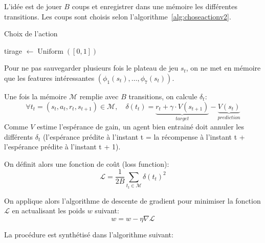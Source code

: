 \documentclass{report}
\DeclareMathOperator{\argmax}{argmax}
\DeclareMathOperator{\uniform}{Uniform}
\begin{document}
L'idée est de jouer \( B \) coups et enregistrer dans une mémoire les différentes
transitions. Les coups sont choisis selon l'algorithme~\ref{alg:choseactionv2}.

\begin{algorithm}[h]
  \caption{Choix de l'action}\label{alg:choseactionv2}
  \begin{algorithmic}
    [1]
    \State{} tirage \(\gets \uniform([0, 1])\)
    \State{}\Return{\(\argmax_{{a_t}\in\mathcal{A}} [r_t + \gamma V(s_{t+1})] \)}
    \\ 
    \Else{}
    \State{}\Return{\(\uniform(\mathcal{A})\)}
    \EndIf{}
    \EndProcedure{}
  \end{algorithmic}
\end{algorithm}

Pour ne pas sauvegarder plusieurs fois le plateau de jeu \(s_t\), on ne met en
mémoire que les features intéressantes \( (\phi_1 (s_t), \hdots, \phi_7(s_t)) \).

Une fois la mémoire \( \mathcal{M} \) remplie avec \( B \) transitions, on
calcule \(\delta_t\):
\[
\forall t_t = (s_t, a_t, r_t, s_{t+1}) \in \mathcal{M},\quad
\delta(t_t) = \underbrace{r_t + \gamma \cdot V(s_{t+1})}_{target} -
\underbrace{V(s_{t})}_{prediction}
\]
Comme \( V \) estime l'espérance de gain, un agent bien entrainé doit annuler
les différents \(\delta_t\) (l'espérance prédite à l'instant t = la récompense
à l'instant t + l'espérance prédite à l'instant t + 1).

On définit alors une fonction de coût (loss function):
\[
\mathcal{L} = \frac{1}{2B} \sum _{t_t \in \mathcal{M}} \delta(t_t)^2
\]

On applique alors l'algorithme de descente de gradient pour minimiser la fonction
\( \mathcal{L} \) en actualisant les poids \( w \) suivant:
\[
w = w - \eta \nabla \mathcal{L}
\]

La procédure est synthétisé dans l'algorithme suivant:
\end{document}
